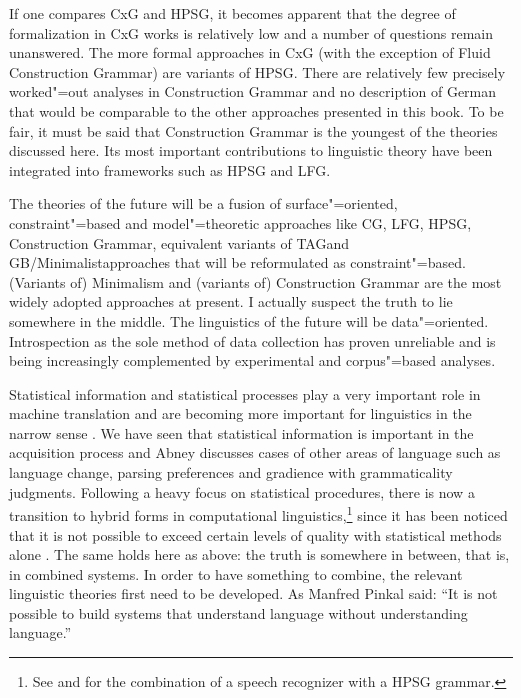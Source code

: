 If one compares CxG and HPSG, it becomes apparent that the degree of formalization in CxG works is relatively low and a number of questions remain
unanswered. The more formal approaches in CxG (with the exception of Fluid Construction Grammar) are variants of HPSG. There are relatively few precisely worked"=out analyses in Construction Grammar
and no description of German that would be comparable to the other approaches presented in this
book. To be fair, it must be said that Construction Grammar
is the youngest of the theories discussed here. Its most important contributions to linguistic theory have been integrated into frameworks such as HPSG and LFG.

The theories of the future will be a fusion of surface"=oriented, constraint"=based and
model"=theoretic approaches like CG\indexcg, LFG\indexlfg, HPSG\indexhpsg,
Construction Grammar\indexcxg, equivalent variants of TAG\indextag and GB/Minimalist\indexgb\indexmp approaches that will be reformulated as constraint"=based.
(Variants of) Minimalism and (variants of) Construction Grammar are the most widely adopted approaches at present. I actually suspect the truth to lie somewhere
in the middle. The linguistics of the future will be data"=oriented. Introspection as the sole method of data collection
has proven unreliable \citep{Mueller2007c,MM2009a} and is being increasingly complemented by experimental and corpus"=based analyses.

Statistical information and statistical processes play a very important role in machine translation and are becoming more important
for linguistics in the narrow sense
\citep{Abney96a}. We
have seen that statistical information is important in the acquisition process and Abney discusses cases of other
areas of language such as language change, parsing preferences and gradience with grammaticality judgments.
Following a heavy focus on statistical procedures, there is now a transition to hybrid forms in computational linguistics,\footnote{
See  and  for the combination of a speech recognizer with a HPSG grammar.
}
since it has been noticed that it is not possible to exceed certain levels of quality with statistical methods alone \citep{Steedman2011a,Church2011a,Kay2011a}. 
The same holds here as above: the truth is somewhere in between, that is, in combined systems. In order to have something to combine, the relevant linguistic theories first
need to be developed. As Manfred Pinkal said: ``It is not possible to build systems that understand language without understanding language.''


